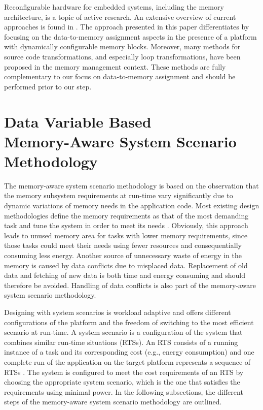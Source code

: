 \documentclass[a4paper,conference]{IEEEtran}
\begin{document}
Reconfigurable hardware for embedded systems, including the memory architecture, is a topic of active research. An extensive overview of current approaches is found in \cite{Garcia}. The approach presented in this paper differentiates by focusing on the data-to-memory assignment aspects in the presence of a platform with dynamically configurable memory blocks. Moreover, many methods for source code transformations, and especially loop transformations, have been proposed in the memory management context. These methods are fully complementary to our focus on data-to-memory assignment and should be performed prior to our step. 

\section{Data Variable Based \\ Memory-Aware System Scenario Methodology}
\label{sec:methodology}

The memory-aware system scenario methodology is based on the observation that the memory subsystem requirements at run-time vary significantly due to dynamic variations of memory needs in the application code. Most existing design methodologies define the memory requirements as that of the most demanding task and tune the system in order to meet its needs \cite{tcm}. Obviously, this approach leads to unused memory area for tasks with lower memory requirements, since those tasks could meet their needs using fewer resources and consequentially consuming less energy. Another source of unnecessary waste of energy in the memory is caused by data conflicts due to misplaced data. Replacement of old data and fetching of new data is both time and energy consuming and should therefore be avoided. Handling of data conflicts is also part of the  memory-aware system scenario methodology.

Designing with system scenarios is workload adaptive and offers different configurations of the platform and the freedom of switching to the most efficient scenario at run-time. A system scenario is a configuration of the system that combines similar run-time situations (RTSs). An RTS consists of a running instance of a task and its corresponding cost (e.g., energy consumption) and one complete run of the application on the target platform represents a sequence of RTSs \cite{Elena2010}. The system is configured to meet the cost requirements of an RTS by choosing the appropriate system scenario, which is the one that satisfies the requirements using minimal power. In the following subsections, the different steps of the memory-aware system scenario methodology are outlined. 
\end{document}

